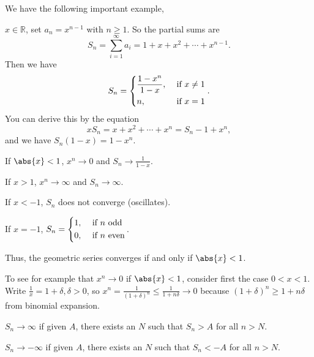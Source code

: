 We have the following important example,
\begin{example}
    \(x\in\mathbb{R}\), set \(a_n = x^{n-1}\) with \(n\geq 1\). So the partial sums are
    \[
        S_n = \sum\limits_{i=1}^{\infty} a_i = 1 + x + x^2 + \cdots + x^{n-1}.
    \]
    Then we have
    \[
        S_n = \begin{dcases}
            \frac{1-x^n}{1-x}, &\text{ if } x\neq 1\\
            n, &\text{ if } x = 1\\
        \end{dcases}.
    \]
    You can derive this by the equation
    \[
        xS_n = x + x^2 + \cdots + x^n = S_n - 1 + x^n,
    \]
    and we have \(S_n(1-x) = 1-x^n\).

    If \(\abs{x} <1\), \(x^n\to 0\) and \(S_n \to \frac{1}{1-x}\).
    
    If \(x > 1\), \(x^n \to \infty\) and \(S_n \to \infty\).

    If \(x<-1\), \(S_n\) does not converge (oscillates).

    If \(x=-1\), \(S_n=\begin{dcases}
        1, &\text{ if } n \text{ odd}\\
        0, &\text{ if } n \text{ even}\\
    \end{dcases}\).

    Thus, the geometric series converges if and only if \(\abs{x} < 1\).

    To see for example that \(x^n \to 0\) if \(\abs{x} <1\), consider first the case \(0< x< 1\). Write \(\frac{1}{x}=1 + \delta, \delta>0\), so \(x^n = \frac{1}{(1+\delta)^n}\leq \frac{1}{1+n\delta}\to 0\) because \((1+\delta)^n \geq 1 + n\delta\) from binomial expansion.
\end{example}

\begin{definition}{}{}
    \(S_n \to \infty\) if given \(A\), there exists an \(N\) such that \(S_n > A\) for all \(n > N\).

    \(S_n \to -\infty\) if given \(A\), there exists an \(N\) such that \(S_n < -A\) for all \(n > N\).
\end{definition}

